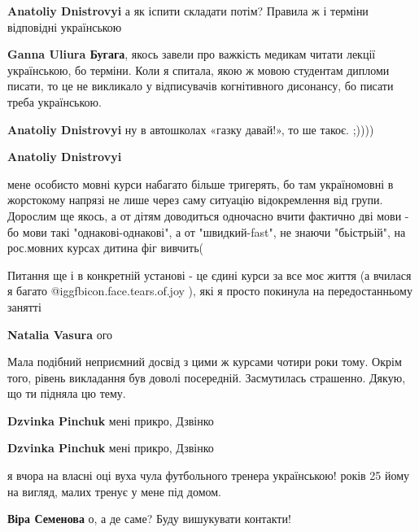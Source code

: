 \begin{itemize}
\begin{itemize} %
\textbf{Anatoliy Dnistrovyi} а як іспити складати потім? Правила ж і терміни відповідні українською

\textbf{Ganna Uliura Бугага}, якось завели про важкість медикам читати лекції українською, бо терміни. Коли я спитала, якою ж мовою студентам дипломи писати, то це не викликало у відписувачів когнітивного дисонансу, бо писати треба українською.

\textbf{Anatoliy Dnistrovyi} ну в автошколах «газку давай!», то ше такоє. ;))))

\textbf{Anatoliy Dnistrovyi} 

мене особисто мовні курси набагато більше тригерять, бо там україномовні в
жорстокому напрязі не лише через саму ситуацію відокремлення від групи.
Дорослим ще якось, а от дітям доводиться одночасно вчити фактично дві мови - бо
мови такі "однакові-однакові", а от "швидкий-fast", не знаючи "бьістрьій", на
рос.мовних курсах дитина фіг вивчить(

\end{itemize} %


Питання ще і в конкретній установі - це єдині курси за все моє життя (а вчилася
я багато  @igg{fbicon.face.tears.of.joy} ), які я просто покинула на передостанньому занятті

\begin{itemize} %
\textbf{Natalia Vasura} ого
\end{itemize} %


Мала подібний неприємний досвід з цими ж курсами чотири роки тому. Окрім того,
рівень викладання був доволі посередній. Засмутилась страшенно. Дякую, що ти
підняла цю тему.

\begin{itemize} %
\textbf{Dzvinka Pinchuk} мені прикро, Дзвінко
\end{itemize} %

\textbf{Dzvinka Pinchuk} мені прикро, Дзвінко

\begin{itemize} %
я вчора на власні оці вуха чула футбольного тренера українською! років 25 йому на вигляд, малих тренує у мене під домом.

\textbf{Віра Семенова} о, а де саме? Буду вишукувати контакти!


\end{itemize}
\end{itemize}
